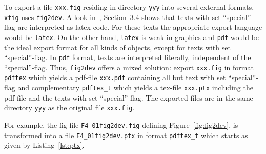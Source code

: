 To export a file \texttt{xxx.fig} residing in directory \texttt{yyy} 
into several external formats, 
\texttt{xfig} uses \texttt{fig2dev}. 
A look in~\cite{XFigF}, Section~3.4 shows that texts with set ``special''-flag 
are interpreted as latex-code. 
For these texts the appropriate export language would be \texttt{latex}. 
On the other hand, \texttt{latex} is weak in graphics 
and \texttt{pdf} would be the ideal export format for all kinds of objects, 
except for texts with set ``special''-flag. 
In \texttt{pdf} format, texts are interpreted literally, 
independent of the ``special''-flag. 
Thus, \texttt{fig2dev} offers a mixed solution: 
export \texttt{xxx.fig} in format \texttt{pdftex} which yields a pdf-file 
\texttt{xxx.pdf} containing all but text with set ``special''-flag 
and complementary \texttt{pdftex\_t} which yields a tex-file \texttt{xxx.ptx} 
including the pdf-file and the texts with set ``special''-flag. %
The exported files are in the same directory \texttt{yyy} 
as the original file \texttt{xxx.fig}. 

For example, 
the fig-file \texttt{F4\_01fig2dev.fig} defining Figure~\ref{fig:fig2dev}, 
is transformed into a file \texttt{F4\_01fig2dev.ptx} 
in format \texttt{pdftex\_t} which starts as given by Listing~\ref{lst:ptx}. 



